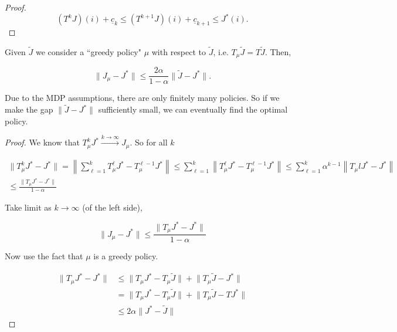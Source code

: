 \begin{enumerate}
\begin{proof}


\[
(T^kJ)(i) + \underline{c}_k \leq (T^{k+1} J)(i)+ \underline{c}_{k+1} \leq J^*(i).
\]

\end{proof}

\begin{theorem}

Given \(\tilde{J}\) we consider a ``greedy policy" \(\mu\) with respect to \(\tilde{J}\), i.e. \(T_\mu \tilde{J} = T \tilde{J}\). Then, 

\[
\lVert J_\mu - J^* \rVert \leq \frac{2 \alpha}{1-\alpha} \lVert \tilde{J} - J^* \rVert.
\]

\end{theorem}

\begin{remark}

Due to the MDP assumptions, there are only finitely many policies. So if we make the gap \(\lVert \tilde{J} - J^* \rVert\) sufficiently small, we can eventually find the optimal policy.

\end{remark}


\begin{proof}

We know that \(T_\mu^k J^* \xrightarrow{k \to \infty} J_\mu\). So for all \(k\)

\begin{multline*}
\lVert T_\mu^k J^* - J^* \rVert = \left\lVert \sum_{\ell = 1}^k T_\mu^\ell J^* - T_\mu^{\ell -1} J^*  \right\rVert \leq  \sum_{\ell = 1}^k \left\lVert  T_\mu^\ell J^* - T_\mu^{\ell -1} J^*  \right\rVert \leq  \sum_{\ell = 1}^k \alpha^{k-1} \left\lVert  T_\mu l J^* -  J^*  \right\rVert
\\ \leq \frac{\lVert T_\mu J^* - J^* \rVert}{1 - \alpha}
\end{multline*}


Take limit as \(k \to \infty\) (of the left side), 

\[
\lVert J_\mu - J^* \rVert \leq  \frac{\lVert T_\mu J^* - J^* \rVert}{1 - \alpha}
\]

Now use the fact that \(\mu\) is a greedy policy.

\begin{align*}
\lVert T_\mu J^* - J^* \rVert & \leq \lVert T_\mu J^* - T_\mu \tilde{J} \rVert + \lVert T_\mu \tilde{J} - J^* \rVert
\\ & =  \lVert T_\mu J^* - T_\mu \tilde{J} \rVert + \lVert T_\mu \tilde{J} - TJ^* \rVert
\\ & \leq 2 \alpha \lVert J^* - \tilde{J} \rVert
\end{align*} 


\end{proof}
\end{enumerate}
